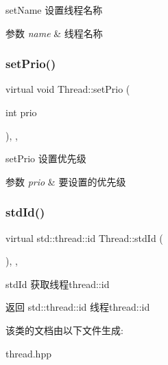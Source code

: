 set\+Name 设置线程名称 


\begin{DoxyParams}{参数}
{\em name} & 线程名称 \\
\hline
\end{DoxyParams}
\mbox{\label{classThread_a96661f80f5fbd26042a24eafd675cd91}} 
\subsubsection{\texorpdfstring{set\+Prio()}{setPrio()}}
{\footnotesize\ttfamily virtual void Thread\+::set\+Prio (\begin{DoxyParamCaption}\item[{int}]{prio }\end{DoxyParamCaption})\hspace{0.3cm}{\ttfamily [inline]}, {\ttfamily [final]}, {\ttfamily [virtual]}}



set\+Prio 设置优先级 


\begin{DoxyParams}{参数}
{\em prio} & 要设置的优先级 \\
\hline
\end{DoxyParams}
\mbox{\label{classThread_a231da16ab1825ee982c4aa43f78c1b22}} 
\subsubsection{\texorpdfstring{std\+Id()}{stdId()}}
{\footnotesize\ttfamily virtual std\+::thread\+::id Thread\+::std\+Id (\begin{DoxyParamCaption}{ }\end{DoxyParamCaption})\hspace{0.3cm}{\ttfamily [inline]}, {\ttfamily [final]}, {\ttfamily [virtual]}}



std\+Id 获取线程thread\+::id 

\begin{DoxyReturn}{返回}
std\+::thread\+::id 线程thread\+::id 
\end{DoxyReturn}


该类的文档由以下文件生成\+:\begin{DoxyCompactItemize}
\item 
thread.\+hpp\end{DoxyCompactItemize}
